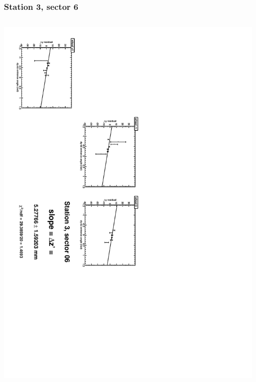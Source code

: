 \documentclass[compress]{beamer}
\begin{document}
\begin{frame}
\frametitle{Station 3, sector 6}
\begin{columns}
\includegraphics[height=\linewidth, angle=90]{zfits/zfit_3_06.pdf}


\end{columns}
\end{frame}
\end{document}
